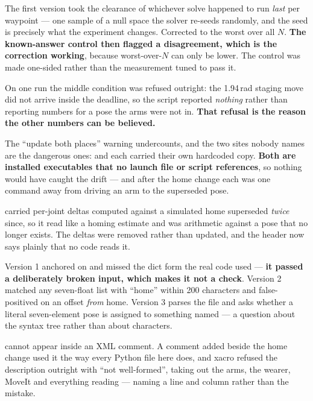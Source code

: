 {The first version took the clearance of whichever solve happened to run
\emph{last} per waypoint --- one sample of a null space the solver re-seeds
randomly, and the seed is precisely what the experiment changes. Corrected to
the worst over all $N$. \textbf{The known-answer control then flagged a
disagreement, which is the correction working}, because worst-over-$N$ can only
be lower. The control was made one-sided rather than the measurement tuned to
pass it.}

{On one run the middle condition was refused outright: the 1.94\,rad staging
move did not arrive inside the deadline, so the script reported \emph{nothing}
rather than reporting numbers for a pose the arms were not in. \textbf{That
refusal is the reason the other numbers can be believed.}}

{The ``update both places'' warning undercounts, and the two sites nobody names
are the dangerous ones:  and 
each carried their own hardcoded copy. \textbf{Both are installed executables
that no launch file or script references}, so nothing would have caught the
drift --- and after the home change each was one command away from driving an
arm to the superseded pose.}

{ carried per-joint deltas computed against a
simulated home superseded \emph{twice} since, so it read like a homing estimate
and was arithmetic against a pose that no longer exists. The deltas were removed
rather than updated, and the header now says plainly that no code reads it.}

{Version 1 anchored on \code{home... = [} and missed the dict form the real code
used --- \textbf{it passed a deliberately broken input, which makes it not a
check}. Version 2 matched any seven-float list with ``home'' within 200
characters and false-positived on an offset \emph{from} home. Version 3 parses
the file and asks whether a literal seven-element pose is assigned to something
named  --- a question about the syntax tree rather than about
characters.}

{\code{-{}-} cannot appear inside an XML comment. A comment added beside the home
change used it the way every Python file here does, and xacro refused the
description outright with ``not well-formed'', taking out the arms, the wearer,
MoveIt and everything reading  --- naming a line and
column rather than the mistake.}

